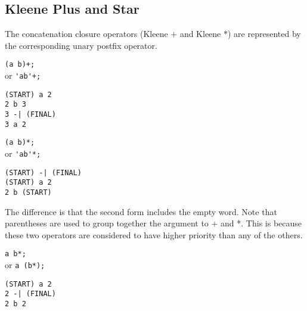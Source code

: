 \subsection{Kleene Plus and Star}
The concatenation closure operators (Kleene $+$ and Kleene $*$) are represented
by the corresponding unary postfix operator.
\begin{center}\begin{minipage}[t]{3in}\begin{minipage}[t]{3in}\begin{tabbing}
\qquad \= \verb#(a b)+;#\\
or \> \verb#'ab'+;#
\end{tabbing}\end{minipage}\end{minipage}
\begin{minipage}[t]{1.6in}\begin{verbatim}
(START) a 2
2 b 3
3 -| (FINAL)
3 a 2
\end{verbatim}\end{minipage}\end{center}
\begin{center}\begin{minipage}[t]{3in}\begin{minipage}[t]{3in}\begin{tabbing}
\qquad \= \verb#(a b)*;#\\
or \> \verb#'ab'*;#
\end{tabbing}\end{minipage}\end{minipage}
\begin{minipage}[t]{1.6in}\begin{verbatim}
(START) -| (FINAL)
(START) a 2
2 b (START)
\end{verbatim}\end{minipage}\end{center}
The difference is that the second form includes the empty word.
Note that parentheses are used to group together the argument to + and *.
This is because these two operators are considered to have higher priority
than any of the others.
\begin{center}\begin{minipage}[t]{3in}\begin{minipage}[t]{3in}\begin{tabbing}
\qquad \= \verb#a b*;#\\
or \> \verb#a (b*);#
\end{tabbing}\end{minipage}\end{minipage}
\begin{minipage}[t]{1.6in}\begin{verbatim}
(START) a 2
2 -| (FINAL)
2 b 2
\end{verbatim}\end{minipage}\end{center}

